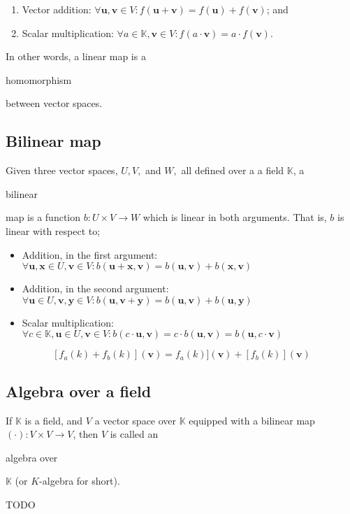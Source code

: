 \documentclass{article}
\newenvironment{itemized}{ 
\begin{itemize}
\setlength{\itemsep}{0pt}
\setlength{\parskip}{0pt}
\setlength{\parsep}{0pt}     
}{\end{itemize}}
\newenvironment{enumerated}{ 
\begin{enumerate}
\setlength{\itemsep}{0pt}
\setlength{\parskip}{0pt}
\setlength{\parsep}{0pt}     
}{\end{enumerate}}
\renewcommand{\vec}[1]{\mathbf{#1}}
\begin{document}
  \begin{enumerated}
    \item Vector addition: $ \forall \vec{u}, \vec{v} \in V : f(\vec{u} + \vec{v}) = f(\vec{u}) + f(\vec{v}) $; and
    \item Scalar multiplication: $ \forall a \in \mathbb{K}, \vec{v} \in V : f(a \cdot \vec{v}) = a \cdot f(\vec{v}). $
  \end{enumerated}

In other words, a linear map is a \begin{em}homomorphism\end{em} between vector spaces.

\subsection*{Bilinear map}

Given three vector spaces, $U, V, $ and $W,$ all defined over a a field $\mathbb{K}$, a \begin{em}bilinear\end{em} map is a function $b : U \times V \rightarrow W$ which is linear in both arguments. That is, $b$ is linear with respect to;

  \begin{itemized}
    \item Addition, in the first argument: $ \forall \vec{u}, \vec{x} \in U, \vec{v} \in V : b(\vec{u} + \vec{x}, \vec{v}) = b(\vec{u}, \vec{v}) + b(\vec{x}, \vec{v}) $
    \item Addition, in the second argument: $ \forall \vec{u} \in U, \vec{v}, \vec{y} \in V : b(\vec{u}, \vec{v} + \vec{y}) = b(\vec{u}, \vec{v}) + b(\vec{u}, \vec{y}) $
    \item Scalar multiplication: $ \forall c \in \mathbb{K}, \vec{u} \in U, \vec{v} \in V : b(c \cdot \vec{u}, \vec{v}) = c \cdot b(\vec{u}, \vec{v}) = b(\vec{u}, c \cdot \vec{v}) $
  \end{itemized}

$$
[f_a(k) + f_b(k)](\vec{v}) = f_a(k)](\vec{v}) + [f_b(k)](\vec{v})
$$

\subsection*{Algebra over a field}

If $\mathbb{K}$ is a field, and $V$ a vector space over $\mathbb{K}$ equipped with a bilinear map $(\cdot) : V \times V \rightarrow V$, then $V$ is called an \begin{em}algebra over\end{em} $\mathbb{K}$ (or $K$-algebra for short).

  TODO
\end{document}
